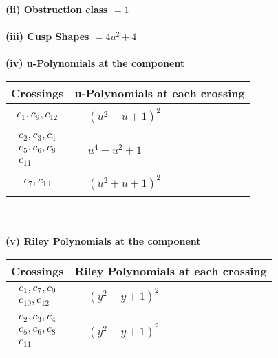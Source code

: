 \documentclass[1p]{elsarticle_modified}
\theoremstyle{definition}
\begin{document}
\flushleft \textbf{(ii) Obstruction class $= 1$}\\~\\
\flushleft \textbf{(iii) Cusp Shapes $= 4 u^2+4$}\\~\\
\newpage\renewcommand{\arraystretch}{1}
\flushleft \textbf{(iv) u-Polynomials at the component}\newline \\
\begin{tabular}{m{50pt}|m{274pt}}
Crossings & \hspace{64pt}u-Polynomials at each crossing \\
\hline $$\begin{aligned}c_{1},c_{9},c_{12}\end{aligned}$$&$\begin{aligned}
&(u^2- u+1)^2
\end{aligned}$\\
\hline $$\begin{aligned}c_{2},c_{3},c_{4}\\c_{5},c_{6},c_{8}\\c_{11}\end{aligned}$$&$\begin{aligned}
&u^4- u^2+1
\end{aligned}$\\
\hline $$\begin{aligned}c_{7},c_{10}\end{aligned}$$&$\begin{aligned}
&(u^2+u+1)^2
\end{aligned}$\\
\hline
\end{tabular}\\~\\
\newpage\renewcommand{\arraystretch}{1}
\flushleft \textbf{(v) Riley Polynomials at the component}\newline \\
\begin{tabular}{m{50pt}|m{274pt}}
Crossings & \hspace{64pt}Riley Polynomials at each crossing \\
\hline $$\begin{aligned}c_{1},c_{7},c_{9}\\c_{10},c_{12}\end{aligned}$$&$\begin{aligned}
&(y^2+y+1)^2
\end{aligned}$\\
\hline $$\begin{aligned}c_{2},c_{3},c_{4}\\c_{5},c_{6},c_{8}\\c_{11}\end{aligned}$$&$\begin{aligned}
&(y^2- y+1)^2
\end{aligned}$\\
\hline
\end{tabular}\\~\\
\end{document}
